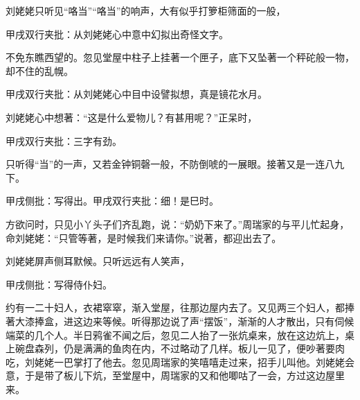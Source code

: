 \begin{parag}
    刘姥姥只听见“咯当”“咯当”的响声，大有似乎打箩柜筛面的一般，\begin{note}甲戌双行夹批：从刘姥姥心中意中幻拟出奇怪文字。\end{note}不免东瞧西望的。忽见堂屋中柱子上挂著一个匣子，底下又坠著一个秤砣般一物，却不住的乱幌。\begin{note}甲戌双行夹批：从刘姥姥心中目中设譬拟想，真是镜花水月。\end{note}刘姥姥心中想著：“这是什么爱物儿？有甚用呢？”正呆时，\begin{note}甲戌双行夹批：三字有劲。\end{note}只听得“当”的一声，又若金钟铜磬一般，不防倒唬的一展眼。接著又是一连八九下。\begin{note}甲戌侧批：写得出。甲戌双行夹批：细！是巳时。\end{note}方欲问时，只见小丫头子们齐乱跑，说：“奶奶下来了。”周瑞家的与平儿忙起身，命刘姥姥：“只管等著，是时候我们来请你。”说著，都迎出去了。
\end{parag}


\begin{parag}
    刘姥姥屏声侧耳默候。只听远远有人笑声，\begin{note}甲戌侧批：写得侍仆妇。\end{note}约有一二十妇人，衣裙窣窣，渐入堂屋，往那边屋内去了。又见两三个妇人，都捧著大漆捧盒，进这边来等候。听得那边说了声“摆饭”，渐渐的人才散出，只有伺候端菜的几个人。半日鸦雀不闻之后，忽见二人抬了一张炕桌来，放在这边炕上，桌上碗盘森列，仍是满满的鱼肉在内，不过略动了几样。板儿一见了，便吵著要肉吃，刘姥姥一巴掌打了他去。忽见周瑞家的笑嘻嘻走过来，招手儿叫他。刘姥姥会意，于是带了板儿下炕，至堂屋中，周瑞家的又和他唧咕了一会，方过这边屋里来。
\end{parag}


